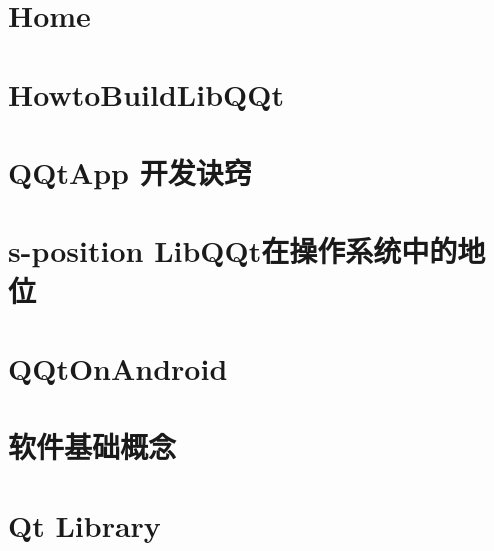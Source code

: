 \documentclass[twoside]{book}
\newcommand{\+}{\discretionary{\mbox{\scriptsize$\hookleftarrow$}}{}{}}
\begin{document}
\chapter{Home}
\label{md__r_1__develop_a0-develop__lib_q_qt_wiki__home}

\chapter{Howto\+Build\+Lib\+Q\+Qt}
\label{md__r_1__develop_a0-develop__lib_q_qt_wiki__howto_build_lib_q_qt}

\chapter{Q\+Qt\+App 开发诀窍}
\label{md__r_1__develop_a0-develop__lib_q_qt_wiki_knack}

\chapter{\textquotesingle{}s-\/position Lib\+Q\+Qt在操作系统中的地位}
\label{md__r_1__develop_a0-develop__lib_q_qt_wiki__lib_q_qt}

\chapter{Q\+Qt\+On\+Android}
\label{md__r_1__develop_a0-develop__lib_q_qt_wiki__q_qt_on_android}

\chapter{软件基础概念}
\label{md__r_1__develop_a0-develop__lib_q_qt_wiki_software}

\chapter{Qt Library}
\label{md__r_1__develop_a0-develop__lib_q_qt_wiki_usage-_qt}

\end{document}
